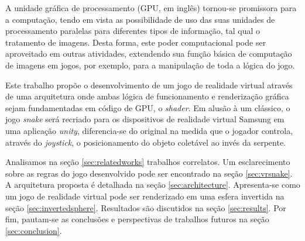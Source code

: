 \documentclass[conference]{IEEEtran}
\begin{document}

A unidade gráfica de processamento (GPU, em inglês) tornou-se promissora para a computação, tendo em vista as possibilidade de uso das suas unidades de processamento paralelas \cite{DBLP:journals/corr/abs-1202-4347} para diferentes tipos de informação, tal qual o tratamento de imagens. Desta forma, este poder computacional pode ser aproveitado em outras atividades, extendendo sua função básica de computação de imagens em jogos, por exemplo, para a manipulação de toda a lógica do jogo. 

Este trabalho propõe o desenvolvimento de um jogo de realidade virtual através de uma arquitetura onde ambas lógica de funcionamento e renderização gráfica sejam fundamentadas em código de GPU, o \textit{shader}. Em alusão à um clássico, o jogo \textit{snake} será recriado para os dispositivos de realidade virtual Samsung em uma aplicação \textit{unity}, diferencia-se do original na medida que o jogador controla, através do \textit{joystick}, o posicionamento do objeto coletável ao invés da serpente.

Analisamos na seção \ref{sec:relatedworks} trabalhos correlatos. Um esclarecimento sobre as regras do jogo desenvolvido pode ser encontrado na seção \ref{sec:vrsnake}. A arquitetura proposta é detalhada na seção \ref{sec:architecture}. Apresenta-se como um jogo de realidade virtual pode ser renderizado em uma esfera invertida na seção \ref{sec:invertedsphere}. Resultados são discutidos na seção \ref{sec:results}. Por fim, pautam-se as conclusões e perspectivas de trabalhos futuros na seção \ref{sec:conclusion}.
\end{document}
